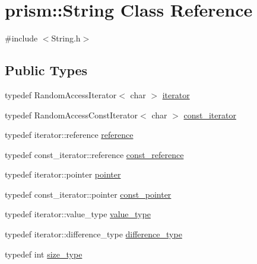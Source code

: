 \hypertarget{classprism_1_1_string}{}\section{prism\+:\+:String Class Reference}
\label{classprism_1_1_string}


{\ttfamily \#include $<$String.\+h$>$}

\subsection*{Public Types}
\begin{DoxyCompactItemize}
\item 
typedef Random\+Access\+Iterator$<$ char $>$ \hyperlink{classprism_1_1_string_adacc7975837e5fff95d70690777fb330}{iterator}
\item 
typedef Random\+Access\+Const\+Iterator$<$ char $>$ \hyperlink{classprism_1_1_string_a8b46f0fbe9c5c94ba892975242e3ab68}{const\+\_\+iterator}
\item 
typedef iterator\+::reference \hyperlink{classprism_1_1_string_a0abe551090035c27a0f80ea403199727}{reference}
\item 
typedef const\+\_\+iterator\+::reference \hyperlink{classprism_1_1_string_a7825c62cb2047e36ec704a17ef94f299}{const\+\_\+reference}
\item 
typedef iterator\+::pointer \hyperlink{classprism_1_1_string_ac7944d9212ad675ba05280657ce14d12}{pointer}
\item 
typedef const\+\_\+iterator\+::pointer \hyperlink{classprism_1_1_string_adbea4cbf0f4f62948eb2accf7d402456}{const\+\_\+pointer}
\item 
typedef iterator\+::value\+\_\+type \hyperlink{classprism_1_1_string_a9808c1cb8dbe4ec046174c3318e577b7}{value\+\_\+type}
\item 
typedef iterator\+::difference\+\_\+type \hyperlink{classprism_1_1_string_a50fc3d423db1d24c511b28b24e4a7c00}{difference\+\_\+type}
\item 
typedef int \hyperlink{classprism_1_1_string_a33d0fff8e7a3f85f43487c6975e3e766}{size\+\_\+type}
\end{DoxyCompactItemize}
